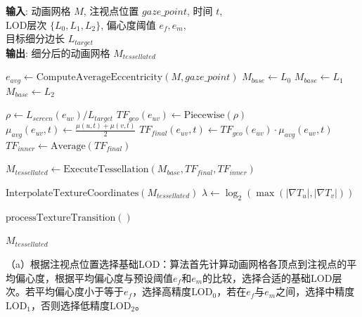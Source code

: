 \begin{algorithm}[htbp]
\caption{感知引导的自适应细分LOD算法}
\label{alg:perceptual-guided-adaptive-tessellation}
\textbf{输入}: 动画网格 $M$, 注视点位置 $gaze\_point$, 时间 $t$, \\
\hspace*{2.4em} LOD层次 $\{L_0, L_1, L_2\}$, 偏心度阈值 $e_f, e_m$, \\
\hspace*{2.4em} 目标细分边长 $L_{target}$ \\
\textbf{输出}: 细分后的动画网格 $M_{tessellated}$
\begin{algorithmic}[1]
    \State $e_{avg} \gets \text{ComputeAverageEccentricity}(M, gaze\_point)$
        \State $M_{base} \gets L_0$ 
        \State $M_{base} \gets L_1$ 
    \Else
        \State $M_{base} \gets L_2$ 
    \EndIf

        \State $\rho \gets L_{screen}(e_{uv}) / L_{target}$ 
        \State $TF_{geo}(e_{uv}) \gets \text{Piecewise}(\rho)$ 
        \State $\mu_{avg}(e_{uv}, t) \gets \frac{\mu(u, t) + \mu(v, t)}{2}$ 
        \State $TF_{final}(e_{uv}, t) \gets TF_{geo}(e_{uv}) \cdot \mu_{avg}(e_{uv}, t)$ 
    \EndFor
    \State $TF_{inner} \gets \text{Average}(TF_{final})$ 
    
    \State $M_{tessellated} \gets \text{ExecuteTessellation}(M_{base}, TF_{final}, TF_{inner})$ 
    
    \State $\text{InterpolateTextureCoordinates}(M_{tessellated})$
        \State $\lambda \gets \log_2 \left( \max \left( | \nabla T_u |, | \nabla T_v | \right) \right)$ 
    \EndFor

        \State $\text{processTextureTransition}()$
    \EndIf
    
    \State \Return $M_{tessellated}$
\end{algorithmic}
\end{algorithm}

（a）根据注视点位置选择基础LOD：算法首先计算动画网格各顶点到注视点的平均偏心度，根据平均偏心度与预设阈值$e_f$和$e_m$的比较，选择合适的基础LOD层次。若平均偏心度小于等于$e_f$，选择高精度$\text{LOD}_0$，若在$e_f$与$e_m$之间，选择中精度$\text{LOD}_1$，否则选择低精度$\text{LOD}_2$。




